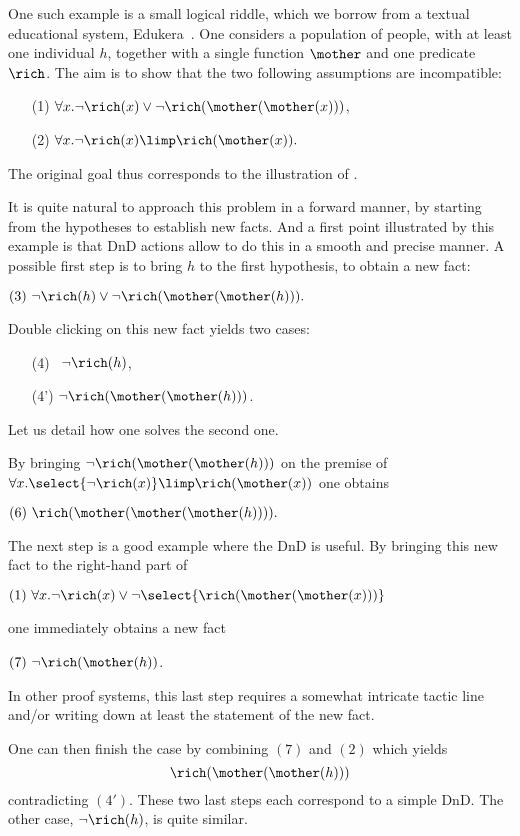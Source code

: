 One such example is a small logical riddle, which we borrow from a
textual educational system, Edukera~\cite{edukera}. One considers a
population of people, with at least one individual $h$, together with a
single function $\mother$ and one predicate $\rich$. The aim is to
show that the two following assumptions are incompatible:
\begin{itemize}
\item[(1)] $\forall x. \neg\rich(x)\lor \neg\rich(\mother(\mother(x)))$,
\item[(2)] $\forall x. \neg\rich(x) \limp \rich(\mother(x)).$
\end{itemize}
The original goal thus corresponds to the illustration of .

It is quite natural to approach this problem in a forward manner, by starting
from the hypotheses to establish new facts. And a first point illustrated by
this example is that DnD actions allow to do this in a smooth and precise
manner. A possible first step is to bring $h$ to the first hypothesis, to obtain
a new fact:

\medskip
$(3) ~\neg\rich(h)\lor \neg\rich(\mother(\mother(h))).$
\medskip

\noindent Double clicking on this new fact yields two cases:
\begin{itemize}
 \item[(4)~] $ \neg\rich(h)$,
 \item[(4')] $ \neg\rich(\mother(\mother(h)))$.
 \end{itemize}
Let us detail how one solves the
second one.

By bringing 
$\neg\rich(\mother(\mother(h)))$ on the premise of $\forall
x. \select{\neg\rich(x)} \limp \rich(\mother(x))$
one obtains

\medskip
$(6) ~\rich(\mother(\mother(\mother(h)))).$
\medskip

The next step is a good example where the DnD is useful. By bringing
this new fact to the right-hand part of

\medskip
$(1)~\forall x. \neg\rich(x)\lor \neg\select{\rich(\mother(\mother(x)))}$
\medskip

\noindent
one immediately obtains a new fact

\medskip
$(7) ~\neg{\rich(\mother(h))}$.
\medskip

\noindent In other proof systems, this last step requires a somewhat intricate
tactic line and/or writing down at least the statement of the new fact.

One can then finish the case by combining $(7)$ and $(2)$ which yields
$$\rich(\mother(\mother(h)))$$ contradicting $(4')$. These two last steps each
correspond to a simple DnD. The other case, $\neg\rich(h)$, is quite similar.

